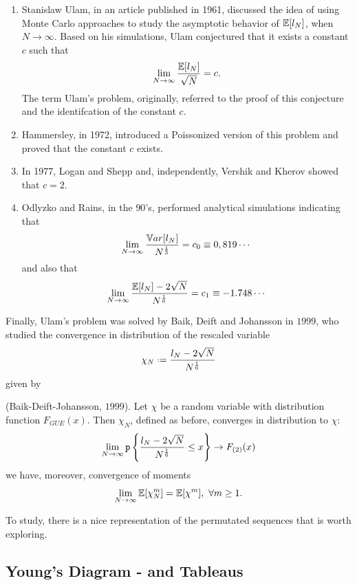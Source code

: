 \begin{enumerate}
	\item Stanislaw Ulam, in an article published in 1961, discussed the idea of using Monte Carlo approaches to study the asymptotic behavior of $\mathbb{E}[l_N]$, when $N \rightarrow \infty$. Based on his simulations, Ulam conjectured that it exists a constant $c$ such that $$\lim_{N \rightarrow \infty} \frac{\mathbb{E}[l_N]}{\sqrt{N}} = c.$$ The term Ulam's problem, originally, referred to the proof of this conjecture and the identifcation of the constant $c$. 
	\item Hammersley, in 1972, introduced a Poissonized version of this problem and proved that the constant $c$ exists. 
	\item In 1977, Logan and Shepp and, independently, Vershik and Kherov showed that $c = 2$. 
	\item Odlyzko and Rains, in the $90$'s, performed analytical simulations indicating that 
	\[
		\lim_{N \rightarrow \infty} \frac{\mathbb{V}ar[l_N]}{N^{\frac{1}{3}}} = c_0 \equiv 0,819\cdots
	\]
	and also that
	\[
	\lim_{N \rightarrow \infty} \frac{\mathbb{E}[l_N] - 2\sqrt{N}}{N^{\frac{1}{6}}} = c_1 \equiv -1.748\cdots
	\]
\end{enumerate}

Finally, Ulam's problem was solved by Baik, Deift and Johansson in $1999$, who studied the convergence in distribution of the rescaled variable 
\begin{equation}
	\chi_N \deff \frac{l_N - 2\sqrt{N}}{N^{\frac{1}{6}}}
\end{equation}
given by
\begin{thm}
	(Baik-Deift-Johansson, $1999$). Let $\chi$ be a random variable with distribution function $F_{GUE}(x)$. Then $\chi_N$, defined as before, converges in distribution to $\chi$: 
	\begin{equation}
		\lim_{N \rightarrow \infty} \mathtt{p}\left\{ \frac{l_N - 2\sqrt{N}}{N^{\frac{1}{6}}} \leq x\right\} \rightarrow F_{(2)}(x)
	\end{equation}
	we have, moreover, convergence of moments
	\begin{equation}
			\lim_{N \rightarrow \infty} \mathbb{E}[\chi_N^m] = \mathbb{E}[\chi^m], \ \forall m \geq 1.
	\end{equation}
\end{thm}

To study, there is a nice representation of the permutated sequences that is worth exploring.

\subsection{Young's Diagram - and Tableaus}

